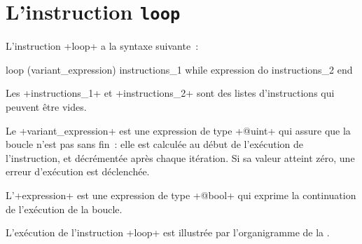 \section{L'instruction \texttt{loop}}


L'instruction \ggst+loop+ a la syntaxe suivante~:
\begin{galgas3box}
loop (variant_expression)
  instructions_1
while expression do
  instructions_2
end
\end{galgas3box}


Les \ggst+instructions_1+ et \ggst+instructions_2+ sont des listes d'instructions qui peuvent être vides.


Le \ggst+variant_expression+ est une expression de type \ggst+@uint+ qui assure que la boucle n'est pas sans fin~: elle est calculée au début de l'exécution de l'instruction, et décrémentée après chaque itération. Si sa valeur atteint zéro, une erreur d'exécution est déclenchée.

L'\ggst+expression+ est une expression de type \ggst+@bool+ qui exprime la continuation de l'exécution de la boucle.

L'exécution de l'instruction \ggst+loop+ est illustrée par l'organigramme de la .


